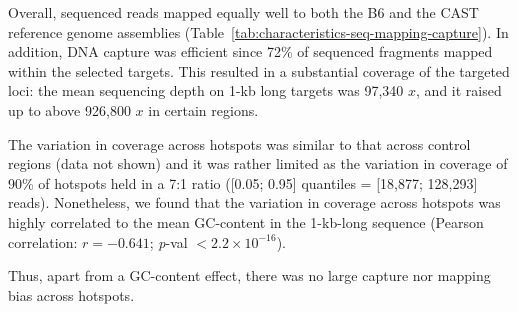 Overall, sequenced reads mapped equally well to both the B6 and the CAST reference genome assemblies (Table~\ref{tab:characteristics-seq-mapping-capture}).
In addition, DNA capture was efficient since 72\% of sequenced fragments mapped within the selected targets.
This resulted in a substantial coverage of the targeted loci: the mean sequencing depth on 1-kb long targets was 97,340 $x$, and it raised up to above 926,800 $x$ in certain regions.

The variation in coverage across hotspots was similar to that across control regions (data not shown) and it was rather limited as the variation in coverage of 90\% of hotspots held in a 7:1 ratio ([0.05; 0.95] quantiles = [18,877; 128,293] reads).
Nonetheless, we found that the variation in coverage across hotspots was highly correlated to the mean GC-content in the 1-kb-long sequence (Pearson correlation: ${r = -0.641}$; \textit{p}-val $< 2.2 \times 10^{-16}$).

Thus, apart from a GC-content effect, there was no large capture nor mapping bias across hotspots.


